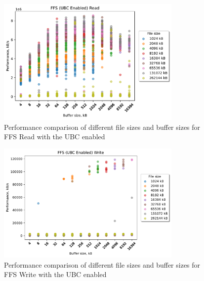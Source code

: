 \clearpage
\begin{figure}[!htb]
	\label{fig:bench_ffs_ubc_scatter_read}
	\begin{center}
		\includegraphics[width=0.8\textwidth]{figures.nosync/benchmarking/FFS/scatter-UBC Enabled-Read.pdf}
	\end{center}
	\caption[Comparison of Read performance for file size and buffer size for FFS with the UBC enabled]{Performance comparison of different file sizes and buffer sizes for FFS Read with the UBC enabled}
\end{figure}
\begin{figure}[!htb]
	\label{fig:bench_ffs_ubc_scatter_write}
	\begin{center}
		\includegraphics[width=0.8\textwidth]{figures.nosync/benchmarking/FFS/scatter-UBC Enabled-Write.pdf}
	\end{center}
	\caption[Comparison of Write performance for file size and buffer size for FFS with the UBC enabled]{Performance comparison of different file sizes and buffer sizes for FFS Write with the UBC enabled}
\end{figure}
\clearpage
